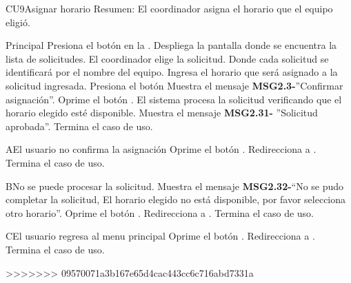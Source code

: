 	\begin{UseCase}{CU9}{Asignar horario}{
		Resumen: El coordinador asigna el horario que el equipo eligió.}
		
	\end{UseCase}
	\newpage
	
	
	\begin{UCtrayectoria}{Principal}
	\UCpaso[\UCactor] Presiona el botón  en la . 
	\UCpaso Despliega la pantalla  donde se encuentra la lista de solicitudes. 
	\UCpaso[\UCactor] El coordinador elige la solicitud. Donde cada solicitud se identificará por el nombre del equipo.
	\UCpaso[\UCactor] Ingresa el horario que será asignado a la solicitud ingresada.
	\UCpaso[\UCactor] Presiona el botón 
	\UCpaso Muestra el mensaje {\bf MSG2.3-}''Confirmar asignación''.
	\UCpaso[\UCactor] Oprime el botón .	
	\UCpaso El sistema procesa la solicitud verificando que el horario elegido esté disponible.
	\UCpaso Muestra el mensaje {\bf MSG2.31-} ''Solicitud aprobada''.  
	\UCpaso[] Termina el caso de uso.   
\end{UCtrayectoria}

\begin{UCtrayectoriaA}{A}{El usuario no confirma la asignación}
	\UCpaso[\UCactor] Oprime el botón .
	\UCpaso Redirecciona a .
	\UCpaso Termina el caso de uso.
	\end{UCtrayectoriaA}

\begin{UCtrayectoriaA}{B}{No se puede procesar la solicitud.}
	\UCpaso Muestra el mensaje {\bf MSG2.32-}``No se pudo completar la solicitud, El horario elegido no está disponible, por favor selecciona otro horario''.
	\UCpaso[\UCactor] Oprime el botón .
	\UCpaso Redirecciona a .
	\UCpaso Termina el caso de uso.
	\end{UCtrayectoriaA}
		
\begin{UCtrayectoriaA}{C}{El usuario regresa al menu principal}
	\UCpaso[\UCactor] Oprime el botón .
	\UCpaso Redirecciona a .
	\UCpaso Termina el caso de uso.
	\end{UCtrayectoriaA}
	
>>>>>>> 09570071a3b167e65d4cac443cc6c716abd7331a
